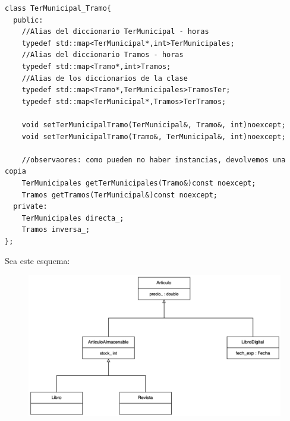 \begin{verbatim}
class TerMunicipal_Tramo{
  public:
    //Alias del diccionario TerMunicipal - horas
    typedef std::map<TerMunicipal*,int>TerMunicipales;
    //Alias del diccionario Tramos - horas
    typedef std::map<Tramo*,int>Tramos;
    //Alias de los diccionarios de la clase 
    typedef std::map<Tramo*,TerMunicipales>TramosTer;
    typedef std::map<TerMunicipal*,Tramos>TerTramos;

    void setTerMunicipalTramo(TerMunicipal&, Tramo&, int)noexcept;
    void setTerMunicipalTramo(Tramo&, TerMunicipal&, int)noexcept;

    //observaores: como pueden no haber instancias, devolvemos una copia
    TerMunicipales getTerMunicipales(Tramo&)const noexcept;
    Tramos getTramos(TerMunicipal&)const noexcept;
  private:
    TerMunicipales directa_;
    Tramos inversa_;
};
\end{verbatim}
\newpage
{} Sea este esquema:
\begin{figure}[h]
  \begin{center}
    \includegraphics[width=\textwidth]{assets/Junio2023_2.png}
  \end{center}
\end{figure}

